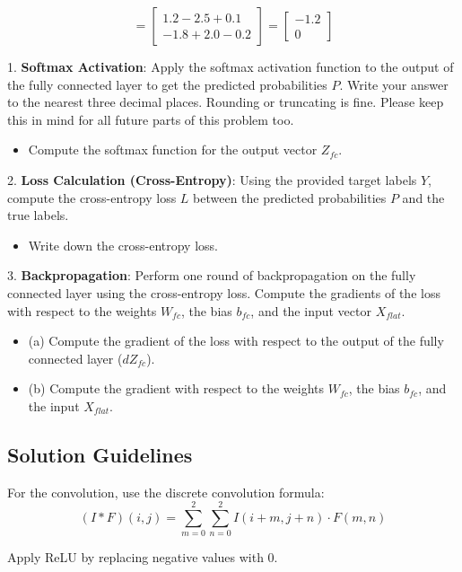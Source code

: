 \documentclass[a4 paper]{article}
\begin{document}
\[
=
\begin{bmatrix}
1.2 - 2.5 + 0.1 \\
-1.8 + 2.0 - 0.2
\end{bmatrix}
=
\begin{bmatrix}
-1.2 \\ 0
\end{bmatrix}
\]



1. \textbf{Softmax Activation}: Apply the softmax activation function to the output of the fully connected layer to get the predicted probabilities $P$. Write your answer to the nearest three decimal places. Rounding or truncating is fine. Please keep this in mind for all future parts of this problem too.
    \begin{itemize}
        \item Compute the softmax function for the output vector $Z_{fc}$.
    \end{itemize}

2. \textbf{Loss Calculation (Cross-Entropy)}: Using the provided target labels $Y$, compute the cross-entropy loss $L$ between the predicted probabilities $P$ and the true labels.
    \begin{itemize}
        \item Write down the cross-entropy loss.
    \end{itemize}

3. \textbf{Backpropagation}: Perform one round of backpropagation on the fully connected layer using the cross-entropy loss. Compute the gradients of the loss with respect to the weights $W_{fc}$, the bias $b_{fc}$, and the input vector $X_{flat}$.
    \begin{itemize}
        \item (a) Compute the gradient of the loss with respect to the output of the fully connected layer ($dZ_{fc}$).
        \item (b) Compute the gradient with respect to the weights $W_{fc}$, the bias $b_{fc}$, and the input $X_{flat}$.
    \end{itemize}

\subsection*{Solution Guidelines}
For the convolution, use the discrete convolution formula:
\[
(I * F)(i, j) = \sum_{m=0}^{2} \sum_{n=0}^{2} I(i+m, j+n) \cdot F(m, n)
\]

Apply ReLU by replacing negative values with 0.
\end{document}

